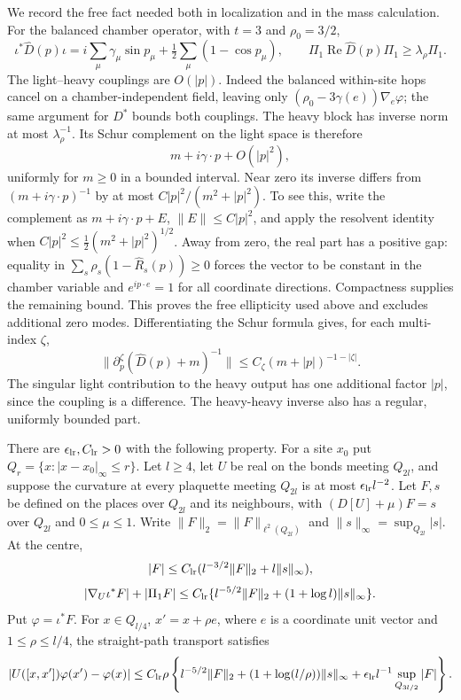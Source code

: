 \documentclass[11pt,letterpaper,reqno]{amsart}
\makeatletter
\theoremstyle{definition}
\newcommand{\ms@minorstart}{%
  \pushQED{\qed}\renewcommand{\qedsymbol}{$\blacksquare$}}
\newenvironment{lemma}[1][]{\ms@minorstart\ms@lemma[#1]}
  {\popQED\endms@lemma}
\theoremstyle{remark}
\makeatother
\begin{document}
We record the free fact needed both in localization and in the
mass calculation.  For the balanced chamber operator, with $t=3$
and $\rho_0=3/2$,
\[
 \iota^*\widehat D(p)\iota
 =i\sum_\mu\gamma_\mu\sin p_\mu+
       \tfrac12\sum_\mu(1-\cos p_\mu),\qquad
 \Pi_1\operatorname{Re}\widehat D(p)\Pi_1
       \ge\lambda_\rho\Pi_1.
\]
The light--heavy couplings are $O(|p|)$.  Indeed the balanced
within-site hops cancel on a chamber-independent field, leaving
only $(\rho_0-3\gamma(e))\nabla_e\varphi$; the same argument for
$D^*$ bounds both couplings.  The heavy block has inverse norm
at most $\lambda_\rho^{-1}$.  Its Schur complement on the light
space is therefore
\[
 m+i\gamma\cdot p+O(|p|^2),
\]
uniformly for $m\ge0$ in a bounded interval.  Near zero its inverse
differs from $(m+i\gamma\cdot p)^{-1}$ by at most
$C|p|^2/(m^2+|p|^2)$.  To see this, write the complement as
$m+i\gamma\cdot p+E$, $\|E\|\le C|p|^2$, and apply the
resolvent identity when $C|p|^2\le\frac12(m^2+|p|^2)^{1/2}$.
Away from zero, the real part has a positive gap: equality in
$\sum_s\rho_s(1-\widehat R_s(p))\ge0$ forces the vector to be
constant in the chamber variable and $e^{ip\cdot e}=1$ for all
coordinate directions.  Compactness supplies the remaining bound.
This proves the free ellipticity used above and excludes additional
zero modes.  Differentiating the Schur formula gives, for each
multi-index $\zeta$,
\[
 \|\partial_p^\zeta(\widehat D(p)+m)^{-1}\|
       \le C_\zeta(m+|p|)^{-1-|\zeta|}.
\]
The singular light contribution to the heavy output has one
additional factor $|p|$, since the coupling is a difference.
The heavy-heavy inverse also has a regular, uniformly bounded part.

\begin{lemma}[Local regularity]\label{C-397-32}
There are $\epsilon_{\rm lr},C_{\rm lr}>0$ with the following property.
For a site $x_0$ put $Q_r=\{x:|x-x_0|_\infty\le r\}$.
Let $l\ge4$, let $U$ be real on the bonds meeting $Q_{2l}$,
and suppose the curvature at every plaquette meeting $Q_{2l}$
is at most $\epsilon_{\rm lr}l^{-2}$.
Let $F,s$ be defined on the places over $Q_{2l}$ and its neighbours,
with $(D[U]+\mu)F=s$ over $Q_{2l}$ and $0\le\mu\le1$.
Write $\|F\|_2=\|F\|_{\ell^2(Q_{2l})}$ and
$\|s\|_\infty=\sup_{Q_{2l}}|s|$. At the centre,
\[
 |F|\le C_{\rm lr}(l^{-3/2}\|F\|_2+l\|s\|_\infty),
\]
\[
 |\nabla_U\iota^*F|+|\Pi_1F|
 \le C_{\rm lr}\{l^{-5/2}\|F\|_2+
                   (1+\log l)\|s\|_\infty\}.
\]
Put $\varphi=\iota^*F$. For $x\in Q_{l/4}$,
$x'=x+\rho e$, where $e$ is a coordinate unit vector and
$1\le\rho\le l/4$, the straight-path transport satisfies
\[
 |U([x,x'])\varphi(x')-\varphi(x)|
 \le C_{\rm lr}\rho\left\{
 l^{-5/2}\|F\|_2+
 (1+\log(l/\rho))\|s\|_\infty+
 \epsilon_{\rm lr}l^{-1}\sup_{Q_{3l/2}}|F|\right\}.
\]
\end{lemma}
\end{document}
